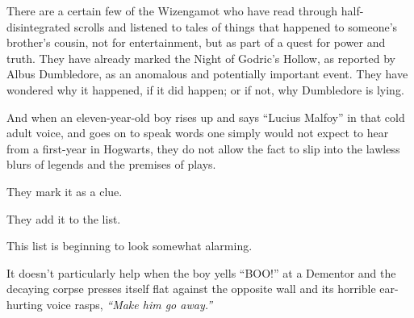 There are a certain few of the Wizengamot who have read through
half-disintegrated scrolls and listened to tales of things that happened
to someone's brother's cousin, not for entertainment, but as part of a
quest for power and truth. They have already marked the Night of
Godric's Hollow, as reported by Albus Dumbledore, as an anomalous and
potentially important event. They have wondered why it happened, if it
did happen; or if not, why Dumbledore is lying.

And when an eleven-year-old boy rises up and says ``Lucius Malfoy'' in
that cold adult voice, and goes on to speak words one simply would not
expect to hear from a first-year in Hogwarts, they do not allow the fact
to slip into the lawless blurs of legends and the premises of plays.

They mark it as a clue.

They add it to the list.

This list is beginning to look somewhat alarming.

It doesn't particularly help when the boy yells ``BOO!'' at a Dementor
and the decaying corpse presses itself flat against the opposite wall
and its horrible ear-hurting voice rasps, \emph{``Make him go away.''}
